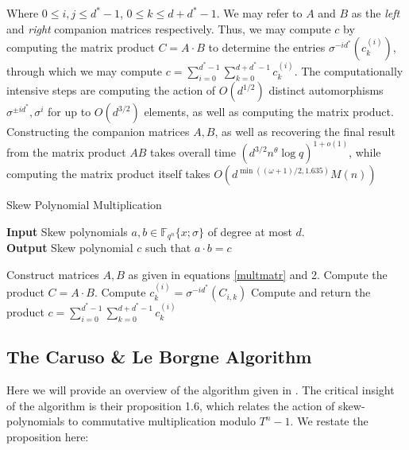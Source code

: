 \documentclass[9pt]{article}
\theoremstyle{plain}
\theoremstyle{definition}
\theoremstyle{remark}
\newcommand{\F}{\mathbb{F}}
\begin{document}
 Where $0 \leq i,j \leq d^* -1$, $0 \leq k \leq d + d^* - 1 $. We may refer to $A$ and $B$ as the \textit{left} and \textit{right} companion matrices respectively. Thus, we may compute $c$ by computing the matrix product $C = A \cdot B$ to determine the entries $\sigma^{-id^*}(c_k^{(i)})$, through which we may compute $c = \sum_{i = 0}^{d^* - 1}\sum_{k = 0}^{d + d^* - 1} c_k^{(i)}$. The computationally intensive steps are computing the action of $O(d^{1/2})$ distinct automorphisms $\sigma^{\pm id^*}, \sigma^i$ for up to $O(d^{3/2})$ elements, as well as computing the matrix product. Constructing the companion matrices $A,B$, as well as recovering the final result from the matrix product $AB$ takes overall time $(d^{3/2} n^{\theta} \log q)^{1 + o(1)}$, while computing the matrix product itself takes $O(d^{\min((\omega + 1)/2, 1.635)} M(n) )$ 
 

\begin{algorithm}
\caption{Skew Polynomial Multiplication \cite{PUCHINGER2017b}}
\label{mpe1}
\hspace*{\algorithmicindent} \textbf{Input} Skew polynomials $a, b \in \F_{q^n}\{x; \sigma\}$ of degree at most $d$. \\
 \hspace*{\algorithmicindent} \textbf{Output} Skew polynomial $c$ such that $a \cdot b = c$ \\
 \begin{algorithmic}[1]
 \State Construct matrices $A, B$ as given in equations \ref{multmatr} and 2.
 \State Compute the product $C = A \cdot B$.
 \State Compute $c_k^{(i)} = \sigma^{-i d^*}(C_{i,k})$ 
 \State Compute and return the product $c = \sum_{i = 0}^{d^* - 1}\sum_{k = 0}^{d + d^* - 1} c_k^{(i)}$
 \end{algorithmic}
\end{algorithm}

\subsection{The Caruso \& Le Borgne Algorithm}

Here we will provide an overview of the algorithm given in \cite[Sec.2]{CaLe17}. The critical insight of the algorithm is their proposition 1.6, which relates the action of skew-polynomials to commutative multiplication modulo $T^n - 1$. We restate the proposition here:
\end{document}
